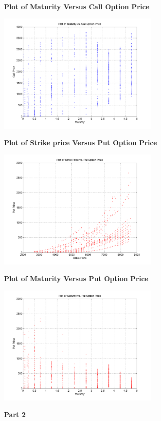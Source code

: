 \documentclass{article}
\begin{document}
\textbf{Plot of Maturity Versus Call Option Price}
\begin{center}
\includegraphics[width =80mm]{Lab9_Q1-Figure4}
\end{center}

\textbf{Plot of Strike price Versus Put Option Price}
\begin{center}
\includegraphics[width =80mm]{Lab9_Q1-Figure5}
\end{center}

\textbf{Plot of Maturity Versus Put Option Price}
\begin{center}
\includegraphics[width =80mm]{Lab9_Q1-Figure6}
\end{center}

\textbf{Part 2}\\
\end{document}
